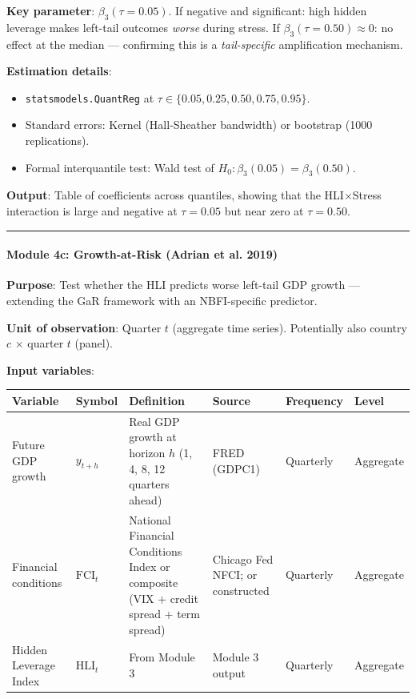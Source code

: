 \documentclass[11pt,a4paper]{article}
\begin{document}
\textbf{Key parameter}: $\beta_3(\tau = 0.05)$. If negative and significant: high hidden leverage makes left-tail outcomes \textit{worse} during stress. If $\beta_3(\tau = 0.50) \approx 0$: no effect at the median --- confirming this is a \textit{tail-specific} amplification mechanism.

\textbf{Estimation details}:
\begin{itemize}
\item \texttt{statsmodels.QuantReg} at $\tau \in \{0.05, 0.25, 0.50, 0.75, 0.95\}$.
\item Standard errors: Kernel (Hall-Sheather bandwidth) or bootstrap (1000 replications).
\item Formal interquantile test: Wald test of $H_0: \beta_3(0.05) = \beta_3(0.50)$.

\end{itemize}
\textbf{Output}: Table of coefficients across quantiles, showing that the HLI$\times$Stress interaction is large and negative at $\tau = 0.05$ but near zero at $\tau = 0.50$.


\bigskip\noindent\rule{\textwidth}{0.4pt}\bigskip


\paragraph{Module 4c: Growth-at-Risk (Adrian et al. 2019)}

\textbf{Purpose}: Test whether the HLI predicts worse left-tail GDP growth --- extending the GaR framework with an NBFI-specific predictor.

\textbf{Unit of observation}: Quarter $t$ (aggregate time series). Potentially also country $c$ $\times$ quarter $t$ (panel).

\textbf{Input variables}:


{\small
\begin{longtable}{|p{}|p{}|p{}|p{}|p{}|p{}|}
\hline
\textbf{Variable} & \textbf{Symbol} & \textbf{Definition} & \textbf{Source} & \textbf{Frequency} & \textbf{Level} \\
\hline
\endhead
Future GDP growth & $y_{t+h}$ & Real GDP growth at horizon $h$ (1, 4, 8, 12 quarters ahead) & FRED (GDPC1) & Quarterly & Aggregate \\
\hline
Financial conditions & $\text{FCI}_t$ & National Financial Conditions Index or composite (VIX + credit spread + term spread) & Chicago Fed NFCI; or constructed & Quarterly & Aggregate \\
\hline
Hidden Leverage Index & $\text{HLI}_t$ & From Module 3 & Module 3 output & Quarterly & Aggregate \\
\hline
\end{longtable}
}
\end{document}
